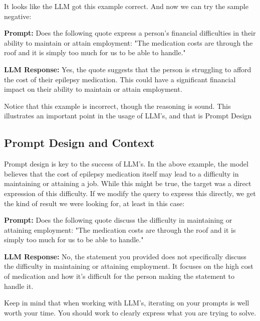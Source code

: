 It looks like the LLM got this example correct. And now we can try the sample negative:

\begin{displayquote}
  \textbf{Prompt:} Does the following quote express a person's financial difficulties in their ability to maintain or attain employment: "The medication costs are through the roof and it is simply too much for us to be able to handle."
\end{displayquote}

\begin{displayquote}
  \textbf{LLM Response:} Yes, the quote suggests that the person is struggling to afford the cost of their epilepsy medication. This could have a significant financial impact on their ability to maintain or attain employment.
\end{displayquote}

Notice that this example is incorrect, though the reasoning is sound. This illustrates an important point in the usage of LLM's, and that is Prompt Design

\subsection{Prompt Design and Context}

Prompt design is key to the success of LLM's. In the above example, the model believes that the cost of epilepsy medication itself may lead to a difficulty in maintaining or attaining a job. While this might be true, the target was a direct expression of this difficulty.
If we modify the query to express this directly, we get the kind of result we were looking for, at least in this case:

\begin{displayquote}
  \textbf{Prompt:} Does the following quote discuss the difficulty in maintaining or attaining employment: "The medication costs are through the roof and it is simply too much for us to be able to handle."
\end{displayquote}

\begin{displayquote}
  \textbf{LLM Response:} No, the statement you provided does not specifically discuss the difficulty in maintaining or attaining employment. It focuses on the high cost of medication and how it's difficult for the person making the statement to handle it.
\end{displayquote}

Keep in mind that when working with LLM's, iterating on your prompts is well worth your time. You should work to clearly express what you are trying to solve.

